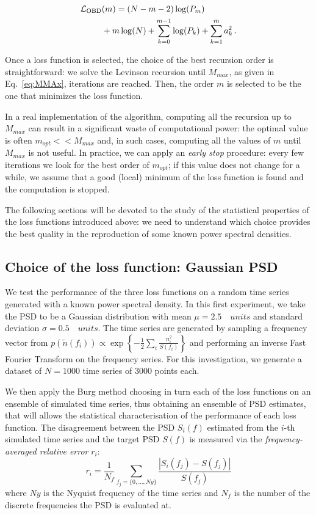 \documentclass[twocolumn,showpacs,preprintnumbers,nofootinbib,prd,
superscriptaddress,10pt]{revtex4-1}
\begin{document}
\begin{itemize}
   \begin{align}
        \mathcal{L}_{\rm OBD}&(m) = (N - m - 2) \log(P_m) \nonumber\\
        &+ m \log(N) + \sum_{k = 0}^{m-1} \log(P_k) + \sum_{k = 1}^{m} a_k^2\,.
    \end{align}
\end{itemize}

Once a loss function is selected, the choice of the best recursion order is straightforward: we solve the Levinson \cite{doi:10.1002/sapm1946251261} recursion until $M_{max}$, as given in Eq.~\eqref{eq:MMAx}, iterations are reached. Then, the order $m$ is selected to be the one that minimizes the loss function.

In a real implementation of the algorithm, computing all the recursion up to $M_{max}$ can result in a significant waste of computational power: the optimal value is often $m_{opt} << M_{max}$ and, in such cases, computing all the values of $m$ until $M_{max}$ is not useful.
In practice, we can apply an \textit{early stop} procedure: every few iterations we look for the best order of $m_{opt}$; if this value does not change for a while, we assume that a good (local) minimum of the loss function is found and the computation is stopped.

The following sections will be devoted to the study of the statistical properties of the loss functions introduced above: we need to understand which choice provides the best quality in the reproduction of some known power spectral densities. 

\subsection{Choice of the loss function: Gaussian PSD} \label{sec:arp_validation}
We test the performance of the three loss functions on a random time series generated with a known power spectral density.
In this first experiment, we take the PSD to be a Gaussian distribution with mean $\mu = 2.5 \quad units$ and standard deviation $\sigma = 0.5 \quad units$.
The time series are generated by sampling a frequency vector from ${p(\tilde{n}(f_i)) \propto \exp{\left\{-\frac{1}{2}\sum_i\frac{n_i ^2}{S(f_i)}\right\}}}$ and performing an inverse Fast Fourier Transform on the frequency series. 
For this investigation, we generate a dataset of $N=1000$ time series of $3000$ points each.

We then apply the Burg method choosing in turn each of the loss functions on an ensemble of simulated time series, 
thus obtaining an ensemble of PSD estimates, that will allows the statistical characterisation of the performance of each loss function.
The disagreement between the PSD $S_i(f)$ estimated from the $i$-th simulated time series and the target PSD $S(f)$ is measured via 
the \textit{frequency-averaged relative error} $r_i$:
\begin{equation}\label{eq:freq_error}
	r_i = \frac{1}{N_f}\sum_{f_j=\{0, \hdots , Ny\}} \frac{|S_i(f_j) - S(f_j)|}{S(f_j)}
\end{equation}
where $Ny$ is the Nyquist frequency of the time series and $N_f$ is the number of the discrete frequencies the PSD is evaluated at.
\end{document}

